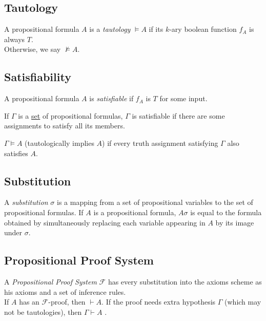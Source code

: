 \documentclass[a4paper]{article}
\newcommand\vdashsub[1]{\mathrel{\stackengine{.4ex}{\vdash}{\;\;\scriptscriptstyle#1}{U}{c}{F}{T}{L}}}
\begin{document}

%
%
%
\subsection{Tautology}

A propositional formula \(A\) is a \textit{tautology} \(\vDash A\) if its \(k\)-ary boolean
function \(f_A\) is always \(T\). \\
Otherwise, we say \(\nvDash A\).

\subsection{Satisfiability}

A propositional formula \(A\) is \textit{satisfiable}
if \(f_A\) is \(T\) for some input.

If \(\Gamma\) is a \underline{set} of propositional formulas, \(\Gamma\)
is satisfiable if there are some assignments to satisfy all its members.

\(\Gamma \vDash A\) (tautologically implies \(A\))
if every truth assignment satisfying \(\Gamma\)
also satisfies \(A\).

\subsection{Substitution}

A \textit{substitution} \(\sigma\)
is a mapping from a set of propositional variables
to the set of propositional formulas.
If \(A\) is a propositional formula, \(A\sigma\)
is equal to the formula obtained by simultaneously
replacing each variable appearing in \(A\)
by its image under \(\sigma\).

\subsection{Propositional Proof System}

A \textit{Propositional Proof System}
\(\mathcal{F}\) has every substitution into the
axioms scheme as his axioms and a set of inference rules.
\\
If \(A\) has an \(\mathcal{F}\)-proof,
then \(\vdash A\). %
If the proof needs extra hypothesis \(\Gamma\)
(which may not be tautologies), then \(\Gamma\vdash A\)
.%
\end{document}
